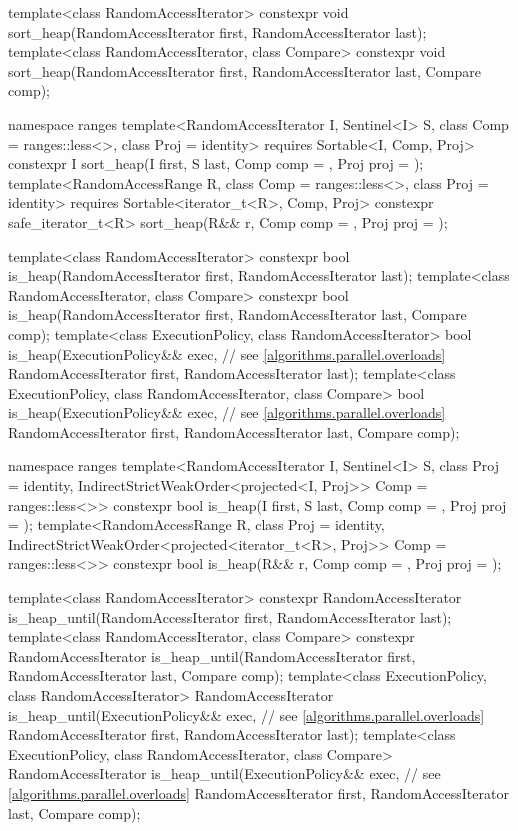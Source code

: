 \begin{codeblock}
{  template<class RandomAccessIterator>
    constexpr void sort_heap(RandomAccessIterator first, RandomAccessIterator last);
  template<class RandomAccessIterator, class Compare>
    constexpr void sort_heap(RandomAccessIterator first, RandomAccessIterator last,
                             Compare comp);

  namespace ranges {
    template<RandomAccessIterator I, Sentinel<I> S, class Comp = ranges::less<>,
        class Proj = identity>
      requires Sortable<I, Comp, Proj>
      constexpr I
        sort_heap(I first, S last, Comp comp = {}, Proj proj = {});
    template<RandomAccessRange R, class Comp = ranges::less<>, class Proj = identity>
      requires Sortable<iterator_t<R>, Comp, Proj>
      constexpr safe_iterator_t<R>
        sort_heap(R&& r, Comp comp = {}, Proj proj = {});
  }

  template<class RandomAccessIterator>
    constexpr bool is_heap(RandomAccessIterator first, RandomAccessIterator last);
  template<class RandomAccessIterator, class Compare>
    constexpr bool is_heap(RandomAccessIterator first, RandomAccessIterator last,
                           Compare comp);
  template<class ExecutionPolicy, class RandomAccessIterator>
    bool is_heap(ExecutionPolicy&& exec, // see \ref{algorithms.parallel.overloads}
                 RandomAccessIterator first, RandomAccessIterator last);
  template<class ExecutionPolicy, class RandomAccessIterator, class Compare>
    bool is_heap(ExecutionPolicy&& exec, // see \ref{algorithms.parallel.overloads}
                 RandomAccessIterator first, RandomAccessIterator last,
                 Compare comp);

  namespace ranges {
    template<RandomAccessIterator I, Sentinel<I> S, class Proj = identity,
        IndirectStrictWeakOrder<projected<I, Proj>> Comp = ranges::less<>>
      constexpr bool is_heap(I first, S last, Comp comp = {}, Proj proj = {});
    template<RandomAccessRange R, class Proj = identity,
        IndirectStrictWeakOrder<projected<iterator_t<R>, Proj>> Comp = ranges::less<>>
      constexpr bool is_heap(R&& r, Comp comp = {}, Proj proj = {});
  }

  template<class RandomAccessIterator>
    constexpr RandomAccessIterator
      is_heap_until(RandomAccessIterator first, RandomAccessIterator last);
  template<class RandomAccessIterator, class Compare>
    constexpr RandomAccessIterator
      is_heap_until(RandomAccessIterator first, RandomAccessIterator last,
                    Compare comp);
  template<class ExecutionPolicy, class RandomAccessIterator>
    RandomAccessIterator
      is_heap_until(ExecutionPolicy&& exec, // see \ref{algorithms.parallel.overloads}
                    RandomAccessIterator first, RandomAccessIterator last);
  template<class ExecutionPolicy, class RandomAccessIterator, class Compare>
    RandomAccessIterator
      is_heap_until(ExecutionPolicy&& exec, // see \ref{algorithms.parallel.overloads}
                    RandomAccessIterator first, RandomAccessIterator last,
                    Compare comp);

}
\end{codeblock}

